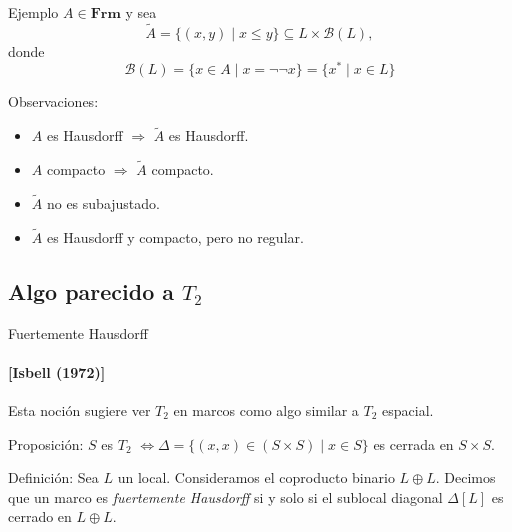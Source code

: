 \documentclass[compress,12pt]{beamer}
\begin{document}
\begin{frame}{Ejemplo}
    $A\in \mathbf{Frm}$ y sea 
    \[
    \tilde{A}=\{(x, y)\mid x\leq y\}\subseteq L\times \mathcal{B}(L),
    \]
    donde
    \[
    \mathcal{B}(L)=\{x\in A\mid x=\neg\neg x\}=\{x^*\mid x\in L\}
    \]

    \begin{block}{Observaciones:}
        \begin{itemize}
            \item<3-> $A$ es Hausdorff $\Rightarrow$ $\tilde{A}$ es Hausdorff.
            \item<4-> $A$ compacto $\Rightarrow$ $\tilde{A}$ compacto.
            \item<5-> $\tilde{A}$ no es subajustado.
            \item<6-> $\tilde{A}$ es Hausdorff y compacto, pero no regular.
        \end{itemize}
    \end{block}
\end{frame}

\subsection{Algo parecido a $T_2$}
\begin{frame}{Fuertemente Hausdorff}
\framesubtitle{[Isbell (1972)]}
Esta noción sugiere ver $T_2$ en marcos como algo similar a $T_2$ espacial.\\  

\begin{block}{Proposición:}
    $S$ es $T_2$ $\Leftrightarrow \Delta=\{(x, x)\in (S\times S)\mid x\in S\}$ es cerrada en $S\times S$.
\end{block}

\end{frame}

\begin{frame}
    \begin{block}{Definición:}
    Sea $L$ un local. Consideramos el coproducto binario $L\oplus L$. Decimos que un marco es \emph{fuertemente Hausdorff} si y solo si el sublocal diagonal $\Delta[L]$ es cerrado en $L\oplus L$.
\end{block}

\end{frame}
\end{document}
